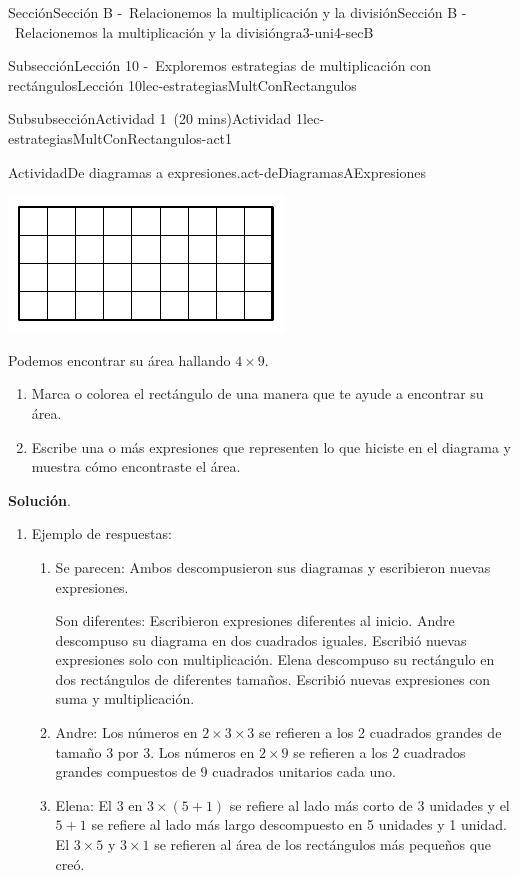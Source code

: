 \documentclass[oneside,10pt,]{article}
\newcommand{\blocktitlefont}{\relax}
\begin{document}
\begin{sectionptx}{Sección}{Sección B -~Relacionemos la multiplicación y la división}{}{Sección B -~Relacionemos la multiplicación y la división}{}{}{gra3-uni4-secB}
\begin{subsectionptx}{Subsección}{Lección 10 -~Exploremos estrategias de multiplicación con rectángulos}{}{Lección 10}{}{}{lec-estrategiasMultConRectangulos}
\begin{subsubsectionptx}{Subsubsección}{Actividad 1~(20 mins)}{}{Actividad 1}{}{}{lec-estrategiasMultConRectangulos-act1}
\begin{activity}{Actividad}{De diagramas a expresiones.}{act-deDiagramasAExpresiones}
\begin{enumerate}
\begin{image}{0}{1}{0}{}
\includegraphics[width=\linewidth]{external/svg-source/tikz-file-153048.pdf}
\end{image}%
Podemos encontrar su área hallando \(4 \times 9\).%
%
\begin{enumerate}
\item{}Marca o colorea el rectángulo de una manera que te ayude a encontrar su área.%
\item{}Escribe una o más expresiones que representen lo que hiciste en el diagrama y muestra cómo encontraste el área.%
\end{enumerate}
\end{enumerate}
\par\smallskip%
\noindent\textbf{\blocktitlefont Solución}.\hypertarget{act-deDiagramasAExpresiones-3}{}\quad{}%
\begin{enumerate}
\item{}Ejemplo de respuestas:%
%
\begin{enumerate}
\item{}Se parecen: Ambos descompusieron sus diagramas y escribieron nuevas expresiones.%
\par
Son diferentes: Escribieron expresiones diferentes al inicio. Andre descompuso su diagrama en dos cuadrados iguales. Escribió nuevas expresiones solo con multiplicación. Elena descompuso su rectángulo en dos rectángulos de diferentes tamaños. Escribió nuevas expresiones con suma y multiplicación.%
\item{}Andre: Los números en \(2 \times 3 \times 3\) se refieren a los 2 cuadrados grandes de tamaño 3 por 3. Los números en \(2 \times 9\) se refieren a los 2 cuadrados grandes compuestos de 9 cuadrados unitarios cada uno.%
\item{}Elena: El 3 en \(3 \times (5 + 1)\) se refiere al lado más corto de 3 unidades y el \(5 + 1\) se refiere al lado más largo descompuesto en 5 unidades y 1 unidad. El \(3 \times 5\) y \(3 \times 1\) se refieren al área de los rectángulos más pequeños que creó.%

\end{enumerate}
\end{enumerate}
\end{activity}
\end{subsubsectionptx}
\end{subsectionptx}
\end{sectionptx}
\end{document}
